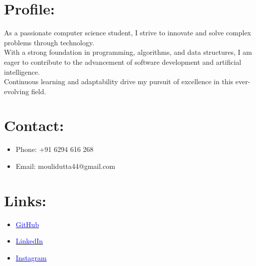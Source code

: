 \documentclass[a4paper, 11pt]{article}
\begin{document}
    \begin{tcolorbox}
        \begin{minipage}[t]{8cm}
            \vspace*{-0.45cm}
            \begin{tcolorbox}[grow to left by=0.6cm, colback=leftcol, colframe=leftcol]
                \section*{Profile:}
                    As a passionate computer science student, I strive to innovate and solve complex problems through technology.\\
                    With a strong foundation in programming, algorithms, and data structures, I am eager to contribute to the advancement of software development and artificial intelligence.\\
                    Continuous learning and adaptability drive my pursuit of excellence in this ever-evolving field.
                \section*{Contact:}
                    \begin{itemize}
                        \item Phone: +91 6294 616 268
                        \item Email: moulidutta44@gmail.com
                    \end{itemize}
    
                \section*{Links:}
                    \begin{itemize}
                        \item \href{https://github.com/mouli-dutta}{\textcolor{blue}{GitHub}}
                        \item \href{https://linkedin.com/in/mouli-dutta}{\textcolor{blue}{LinkedIn}}
                        \item \href{https://instagram.com/penstrokesgallery?igshid=MzNlNGNkZWQ4Mg==}{\textcolor{blue}{Instagram}}
                    \end{itemize}
    

\end{tcolorbox}
\end{minipage}
\end{tcolorbox}
\end{document}
